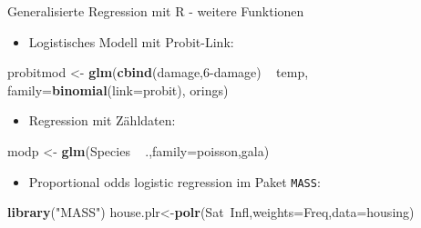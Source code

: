 \documentclass[ignorenonframetext,]{beamer}
\newenvironment{Shaded}{}{}
\newcommand{\KeywordTok}[1]{\textcolor[rgb]{0.00,0.44,0.13}{\textbf{{#1}}}}
\newcommand{\DataTypeTok}[1]{\textcolor[rgb]{0.56,0.13,0.00}{{#1}}}
\newcommand{\DecValTok}[1]{\textcolor[rgb]{0.25,0.63,0.44}{{#1}}}
\newcommand{\StringTok}[1]{\textcolor[rgb]{0.25,0.44,0.63}{{#1}}}
\newcommand{\NormalTok}[1]{{#1}}
\providecommand{\tightlist}{%
\setlength{\itemsep}{0pt}\setlength{\parskip}{0pt}}
\begin{document}
\begin{frame}[fragile]{Generalisierte Regression mit R - weitere
Funktionen}

\begin{itemize}
\tightlist
\item
  Logistisches Modell mit Probit-Link:
\end{itemize}

\begin{Shaded}
\begin{Highlighting}[]
\NormalTok{probitmod <-}\StringTok{ }\KeywordTok{glm}\NormalTok{(}\KeywordTok{cbind}\NormalTok{(damage,}\DecValTok{6}\NormalTok{-damage) ~}\StringTok{ }\NormalTok{temp, }
    \DataTypeTok{family=}\KeywordTok{binomial}\NormalTok{(}\DataTypeTok{link=}\NormalTok{probit), orings)}
\end{Highlighting}
\end{Shaded}

\begin{itemize}
\tightlist
\item
  Regression mit Zähldaten:
\end{itemize}

\begin{Shaded}
\begin{Highlighting}[]
\NormalTok{modp <-}\StringTok{ }\KeywordTok{glm}\NormalTok{(Species ~}\StringTok{ }\NormalTok{.,}\DataTypeTok{family=}\NormalTok{poisson,gala)}
\end{Highlighting}
\end{Shaded}

\begin{itemize}
\tightlist
\item
  Proportional odds logistic regression im Paket \texttt{MASS}:
\end{itemize}

\begin{Shaded}
\begin{Highlighting}[]
\KeywordTok{library}\NormalTok{(}\StringTok{"MASS"}\NormalTok{)}
\NormalTok{house.plr<-}\KeywordTok{polr}\NormalTok{(Sat~Infl,}\DataTypeTok{weights=}\NormalTok{Freq,}\DataTypeTok{data=}\NormalTok{housing)}
\end{Highlighting}
\end{Shaded}

\end{frame}
\end{document}
